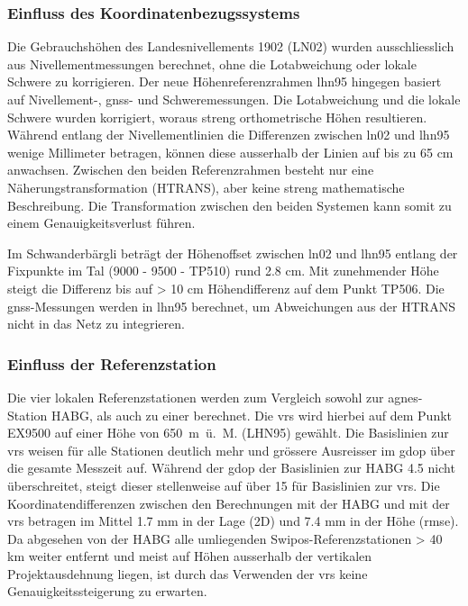 \subsubsection{Einfluss des Koordinatenbezugssystems}
\label{sec:koordbezsys}
Die Gebrauchshöhen des Landesnivellements 1902 (LN02) wurden ausschliesslich aus Nivellementmessungen berechnet, ohne die Lotabweichung oder lokale 
Schwere zu korrigieren. Der neue Höhenreferenzrahmen 
\gls{lhn95} hingegen basiert auf Nivellement-, \acrshort{gnss}- und Schweremessungen. Die  
Lotabweichung und die lokale Schwere wurden korrigiert, woraus streng orthometrische Höhen resultieren. Während entlang 
der Nivellementlinien die Differenzen zwischen \gls{ln02} und \gls{lhn95} wenige Millimeter betragen, können diese 
ausserhalb der Linien auf bis zu 65 cm anwachsen. Zwischen den 
beiden Referenzrahmen besteht nur eine Näherungstransformation (HTRANS), aber keine streng mathematische Beschreibung. 
Die Transformation zwischen den beiden Systemen kann somit zu einem Genauigkeitsverlust führen. \parencite{schlatterNeueLandeshohennetzSchweiz2006}

Im Schwanderbärgli beträgt der Höhenoffset zwischen \gls{ln02} und \gls{lhn95} entlang der Fixpunkte im Tal (9000 - 9500 - TP510) 
rund 2.8 cm. Mit zunehmender Höhe steigt die Differenz bis auf > 10 cm Höhendifferenz auf dem Punkt TP506. 
Die \acrshort{gnss}-Messungen werden in \gls{lhn95} berechnet, um Abweichungen aus der HTRANS nicht in das Netz zu integrieren. 

\subsubsection{Einfluss der Referenzstation}
\label{sec:refstation}
Die vier lokalen Referenzstationen werden zum Vergleich sowohl zur \acrshort{agnes}-Station HABG, als auch zu einer
 berechnet. Die \gls{vrs} wird hierbei auf dem Punkt EX9500 auf einer Höhe von 650~m~ü.~M. (LHN95) gewählt. 
Die Basislinien zur \gls{vrs} weisen für alle Stationen deutlich mehr und grössere Ausreisser im \gls{gdop} über die gesamte Messzeit auf. 
Während der \gls{gdop} der Basislinien zur HABG 4.5 nicht überschreitet, steigt dieser stellenweise auf über 15 für Basislinien zur \gls{vrs}.
Die Koordinatendifferenzen zwischen den Berechnungen mit der HABG und mit der \gls{vrs} betragen im Mittel 1.7 mm in der Lage (2D) und 7.4 mm in der Höhe (\acrshort{rmse}). 
Da abgesehen von der HABG alle umliegenden Swipos-Referenzstationen > 40 km weiter entfernt und meist auf Höhen 
ausserhalb der vertikalen Projektausdehnung liegen, ist durch das Verwenden der \gls{vrs} keine Genauigkeitssteigerung zu 
erwarten.


